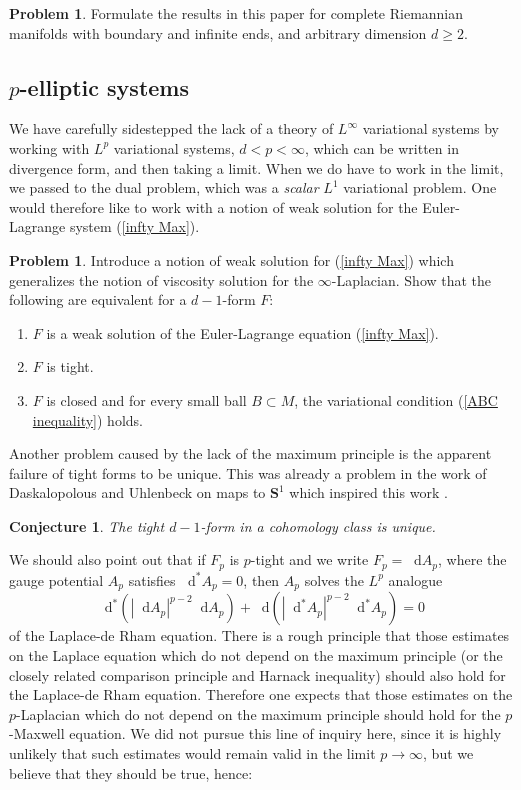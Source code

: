 \documentclass[reqno,11pt]{amsart}
\newcommand{\Sph}{\mathbf S}
\newcommand*\dif{\mathop{}\!\mathrm{d}}
\newtheorem{conjecture}[theorem]{Conjecture}
\theoremstyle{definition}
\newtheorem{problem}[theorem]{Problem}
\numberwithin{equation}{section}
\begin{document}
\begin{problem}\label{generalization}
Formulate the results in this paper for complete Riemannian manifolds with boundary and infinite ends, and arbitrary dimension $d \geq 2$.
\end{problem}


\subsection{\texorpdfstring{$p$-elliptic systems}{p-elliptic systems}}
We have carefully sidestepped the lack of a theory of $L^\infty$ variational systems by working with $L^p$ variational systems, $d < p < \infty$, which can be written in divergence form, and then taking a limit.
When we do have to work in the limit, we passed to the dual problem, which was a \emph{scalar} $L^1$ variational problem.
One would therefore like to work with a notion of weak solution for the Euler-Lagrange system (\ref{infty Max}).

\begin{problem}
Introduce a notion of weak solution for (\ref{infty Max}) which generalizes the notion of viscosity solution for the $\infty$-Laplacian.
Show that the following are equivalent for a $d - 1$-form $F$:
\begin{enumerate}
\item $F$ is a weak solution of the Euler-Lagrange equation (\ref{infty Max}).
\item $F$ is tight.
\item $F$ is closed and for every small ball $B \subset M$, the variational condition (\ref{ABC inequality}) holds.
\end{enumerate}
\end{problem}

Another problem caused by the lack of the maximum principle is the apparent failure of tight forms to be unique.
This was already a problem in the work of Daskalopolous and Uhlenbeck on maps to $\Sph^1$ which inspired this work \cite[Conjecture 9.2]{daskalopoulos2020transverse}.

\begin{conjecture}
The tight $d - 1$-form in a cohomology class is unique.
\end{conjecture}

We should also point out that if $F_p$ is $p$-tight and we write $F_p = \dif A_p$, where the gauge potential $A_p$ satisfies $\dif^* A_p = 0$, then $A_p$ solves the $L^p$ analogue 
$$\dif^*(|\dif A_p|^{p - 2} \dif A_p) + \dif(|\dif^* A_p|^{p - 2} \dif^* A_p) = 0$$
of the Laplace-de Rham equation. 
There is a rough principle that those estimates on the Laplace equation which do not depend on the maximum principle (or the closely related comparison principle and Harnack inequality) should also hold for the Laplace-de Rham equation.
Therefore one expects that those estimates on the $p$-Laplacian which do not depend on the maximum principle should hold for the $p$-Maxwell equation.
We did not pursue this line of inquiry here, since it is highly unlikely that such estimates would remain valid in the limit $p \to \infty$, but we believe that they should be true, hence:
\end{document}
